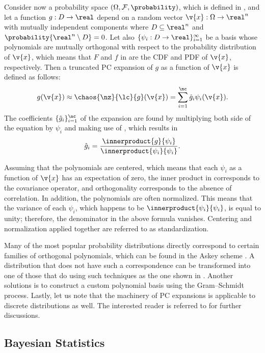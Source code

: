 Consider now a probability space $(\Omega, \mathcal{F}, \probability)$, which is
defined in , and let a function $g: D \to \real$ depend
on a random vector $\v{x}: \Omega \to \real^n$ with mutually independent
components where $D \subseteq \real^n$ and $\probability{\real^n \setminus D} =
0$. Let also $\{ \psi_i: D \to \real \}_{i = 1}^\infty$ be a basis whose
polynomials are mutually orthogonal with respect to the probability distribution
of $\v{x}$, which means that $F$ and $f$ in  are
the \ac{CDF} and \ac{PDF} of $\v{x}$, respectively. Then a truncated \ac{PC}
expansion of $g$ as a function of $\v{x}$ is defined as follows:
\[
  g(\v{x}) \approx \chaos{\nz}{\lc}{g}(\v{x}) = \sum_{i = 1}^\nc \hat{g}_i \psi_i(\v{x}).
\]
The coefficients $\{ \hat{g}_i \}_{i = 1}^\nc$ of the expansion are found by
multiplying both side of the equation by $\psi_i$ and making use of
, which results in
\[
  \hat{g}_i = \frac{\innerproduct{g}{\psi_i}}{\innerproduct{\psi_i}{\psi_i}}.
\]

Assuming that the polynomials are centered, which means that each $\psi_i$ as a
function of $\v{x}$ has an expectation of zero, the inner product in
 corresponds to the covariance operator, and
orthogonality corresponds to the absence of correlation. In addition, the
polynomials are often normalized. This means that the variance of each $\psi_i$,
which happens to be $\innerproduct{\psi_i}{\psi_i}$, is equal to unity;
therefore, the denominator in the above formula vanishes. Centering and
normalization applied together are referred to as standardization.

Many of the most popular probability distributions directly correspond to
certain families of orthogonal polynomials, which can be found in the Askey
scheme \cite{xiu2010}. A distribution that does not have such a correspondence
can be transformed into one of those that do using such techniques as the one
shown in . Another solutions is to construct a
custom polynomial basis using the Gram--Schmidt process. Lastly, let us note
that the machinery of \ac{PC} expansions is applicable to discrete distributions
as well. The interested reader is referred to \cite{xiu2010} for further
discussions.

\subsection{Bayesian Statistics}

